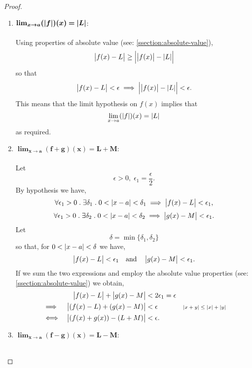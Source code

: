 \documentclass[../MathsNotesBase.tex]{subfiles}
\begin{document}
{\begin{proof}
\begin{enumerate}[label=(\roman*)]
{					Furthermore,
					\begin{align*}
					&& \abs{f(x) - L} &< \epsilon_1 \\
					&\iff & \abs{c}\abs{f(x) - L} &< \abs{c}\epsilon_1 &\sidecomment{} \\
					&\iff & \abs{cf(x) - cL} &< \abs{c}\epsilon_1 = \abs{c}\frac{\epsilon}{\abs{c}} = \epsilon. &\sidecomment{by \autoref{prop:product-of-absolute-vals-is-absolute-val-of-product}}
					\end{align*}
					\bigskip
				}
				\item{${\bm{ \lim_{x \to a} (\left\lvert f\right\rvert)(x) = \left\lvert L\right\rvert }}$:\\\\
					Using properties of absolute value (see: \ref{ssection:absolute-value}), 
					\[ \left\lvert f(x) - L\right\rvert \geq \left\lvert\left\lvert f(x)\right\rvert - \left\lvert L\right\rvert\right\rvert \]
					so that
					\[ \left\lvert f(x) - L\right\rvert < \epsilon \implies \left\lvert\left\lvert f(x)\right\rvert - \left\lvert L\right\rvert\right\rvert < \epsilon. \]
					This means that the limit hypothesis on $f(x)$ implies that
					\[ \lim_{x \to a} (\left\lvert f\right\rvert)(x) = \left\lvert L\right\rvert \]
					as required.
					\bigskip
				}
				\item{${\bm{ \lim_{x \to a} (f + g)(x) = L + M }}$:\\\\
					Let 
					\[ \epsilon > 0,\; \epsilon_1 = \frac{\epsilon}{2}.\]
					By hypothesis we have,
					\[ \forall \epsilon_1 > 0 \;.\; \exists \delta_1 \;.\; 0 < \left\lvert x - a\right\rvert < \delta_1 \implies \left\lvert f(x) - L\right\rvert < \epsilon_1, \]
					\[ \forall \epsilon_1 > 0 \;.\; \exists \delta_2 \;.\; 0 < \left\lvert x - a\right\rvert < \delta_2 \implies \left\lvert g(x) - M\right\rvert < \epsilon_1. \]
					Let 
					\[ \delta = \min \{\delta_1,\delta_2\} \]
					so that, for ${ 0 < \left\lvert x - a\right\rvert < \delta }$ we have,
					\[  \left\lvert f(x) - L\right\rvert < \epsilon_1 \hspace{10pt}\text{and}\hspace{10pt} \left\lvert g(x) - M\right\rvert < \epsilon_1. \]
					If we sum the two expressions and employ the absolute value properties (see: \ref{ssection:absolute-value}) we obtain,
					\begin{align*}
					&& \left\lvert f(x) - L\right\rvert + \left\lvert g(x) - M\right\rvert &<  2\epsilon_1 = \epsilon \\
					&\implies & \left\lvert(f(x) - L) + (g(x) - M)\right\rvert &<  \epsilon &\text{\scriptsize{${ \left\lvert x + y\right\rvert \leq \left\lvert x\right\rvert + \left\lvert y\right\rvert }$}} \\
					&\iff & \left\lvert(f(x) + g(x)) - (L + M)\right\rvert &<  \epsilon. &\text{\scriptsize{}}
					\end{align*}
					\bigskip
				}
				\item{${\bm{ \lim_{x \to a} (f - g)(x) = L - M }}$:\\\\
}
\end{enumerate}
\end{proof}}
\end{document}
